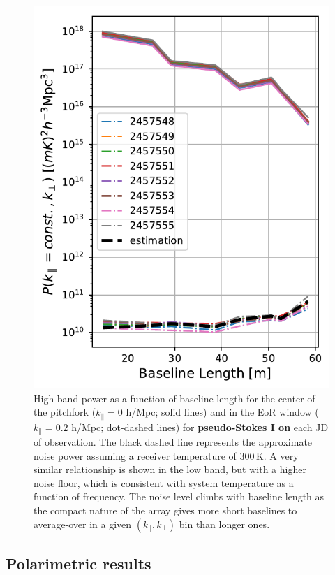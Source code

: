 \documentclass[twocolumn, trackchanges]{aastex61}
\newcommand{\edited}[1]{{\bf \color{red} #1}}
\begin{document}
\begin{figure}
\centering
\includegraphics[scale=0.5]{noise_estimation.pdf}
\caption{High band power as a function of baseline length for the center of the pitchfork ($k_{\parallel}=0$ h/Mpc; solid lines) and in the EoR window ($k_{\parallel}=0.2$ h/Mpc; dot-dashed lines) for \edited{pseudo-Stokes I on} each JD of observation. The black dashed line represents the approximate noise power assuming a receiver temperature of 300\,K. A very similar relationship is shown in the low band, but with a higher noise floor, which is consistent with system temperature as a function of frequency. The noise level climbs with baseline length as the compact nature of the array gives more short baselines to average-over in a given $(k_{\parallel},k_{\perp})$ bin than longer ones.}
\label{fig:highband_cuts_per_day}
\end{figure}

\subsection{Polarimetric results}
\label{subsec:polarimetric_results}
\end{document}
